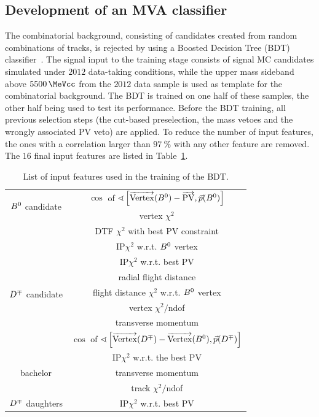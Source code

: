 \subsection{Development of an MVA classifier}
\label{sec:mvaclassifier}

The combinatorial background, consisting of candidates created from 
random combinations of tracks, is rejected by using a Boosted Decision Tree
(BDT) classifier~\cite{Breiman, Roe}. The signal input to the training stage consists of signal
MC candidates simulated under $\num{2012}$ data-taking conditions, while the upper mass sideband above
$\SI{5500}{\MeVcc}$ from the $\num{2012}$ data sample is used as template for the
combinatorial background. The BDT is trained on one half of these samples, the
other half being used to test its performance. Before the BDT training,
all previous selection steps (the cut-based preselection, the mass vetoes and the wrongly
associated PV veto) are applied. To reduce the number of input features, the ones 
with a correlation larger than $\SI{97}{\percent}$ with any other feature are removed.
The $\num{16}$ final input features are listed in Table~\ref{tab:BDTinput}.
%
\begin{table}[t]
	\centering
	\caption{List of input features used in the training of the BDT.}
	\begin{tabular}{cc}
		\toprule
		\multirow{2}{*}{$B^0$ candidate}  &  $\cos$ of $\sphericalangle\left[\overrightarrow{\rm Vertex}(B^0)-\overrightarrow{\rm PV},\vec{p}(B^0)\right]$ \\
				    &  vertex $\chi^2$\\
				    & DTF $\chi^2$ with best PV constraint \\
		\midrule
		\multirow{7}{*}{$D^\mp$ candidate} & IP$\chi^2$ w.r.t. $B^0$ vertex\\
				  & IP$\chi^2$ w.r.t. best PV\\
											  & radial flight distance\\
											  &flight distance $\chi^2$ w.r.t. $B^0$ vertex\\
												  & vertex $\chi^2/$ndof \\
				  &transverse momentum \\
				  &$\cos$ of $\sphericalangle\left[\overrightarrow{\rm Vertex}(D^\mp)-\overrightarrow{\rm Vertex}(B^0),\vec{p}(D^\mp)\right]$ \\
		\midrule
		\multirow{3}{*}{bachelor \pipm} & IP$\chi^2$ w.r.t. the best PV\\
				    & transverse momentum\\
				    & track $\chi^2/$ndof\\
		\midrule
		$D^\mp$ daughters & IP$\chi^2$ w.r.t. best PV\\
		\bottomrule
	\end{tabular}
	\label{tab:BDTinput}
\end{table}
